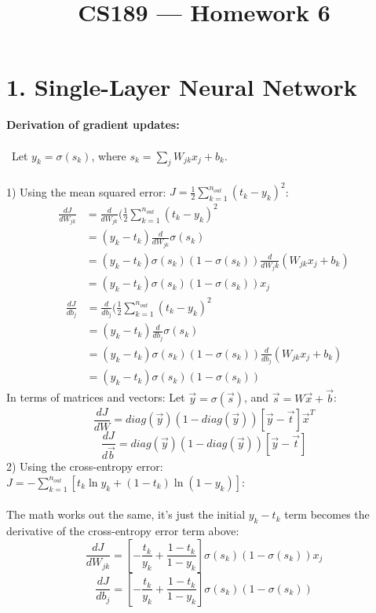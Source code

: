 \documentclass[11pt]{article}
\title{CS189 --- Homework 6}
\author{\Name}
\begin{document}
\maketitle

\section*{1. Single-Layer Neural Network}

\textbf{ Derivation of gradient updates: }
\\\\\
Let $y_k = \sigma ( s_k  ) $, where $s_k  = \sum_j W_{jk} x_j + b_k $.
\\\\
1) Using the mean squared error: $J = \frac{1}{2} \sum_{k=1}^{n_{out}} (t_k - y_k)^2 $:
$$ \begin{aligned}
\frac{dJ}{d W_{jk} } &= \frac{d}{d W_{jk}} ( \frac{1}{2} \sum_{k=1}^{n_{out}} (t_k - y_k)^2 \\
&= (y_k - t_k) \frac{d}{d W_{jk}} \sigma(s_k) \\
&= (y_k - t_k) \sigma(s_k) (1 - \sigma(s_k)) \frac{d}{d W_jk} (W_{jk} x_j + b_k) \\
&= (y_k - t_k) \sigma(s_k) (1 - \sigma(s_k)) x_j 
\end{aligned} $$
$$ \begin{aligned}
\frac{dJ}{d b_j } &= \frac{d}{d b_j} ( \frac{1}{2} \sum_{k=1}^{n_{out}} (t_k - y_k)^2 \\
&= (y_k - t_k) \frac{d}{d b_j} \sigma(s_k) \\
&= (y_k - t_k) \sigma(s_k) (1 - \sigma(s_k)) \frac{d}{d b_j} (W_{jk} x_j + b_k) \\
&= (y_k - t_k) \sigma(s_k) (1 - \sigma(s_k)) 
\end{aligned} $$
In terms of matrices and vectors:
Let $\vec{y} = \sigma ( \vec{s} )$, and $\vec{s} = W \vec{x} + \vec{b} $:
$$ \boxed{\frac{dJ} {dW} = diag(\vec{y}) (1 - diag(\vec{y})) [ \vec{y} - \vec{t} ] \vec{x}^T} $$
$$ \boxed{\frac{dJ} {d\vec{b}} = diag(\vec{y}) (1 - diag(\vec{y})) [ \vec{y} - \vec{t} ]} $$
2) Using the cross-entropy error: $J = - \sum_{k=1}^{n_{out}} [t_k \ln y_k + (1 - t_k) \ln (1 - y_k)] $:
\\\\
The math works out the same, it's just the initial $y_k - t_k$ term becomes the derivative of the cross-entropy error term above:
$$ \frac{dJ}{d W_{jk} } = [ - \frac{t_k}{y_k} + \frac{1 - t_k}{1 - y_k} ] \sigma(s_k) (1 - \sigma(s_k)) x_j $$
$$ \frac{dJ}{d b_j } = [ - \frac{t_k}{y_k} + \frac{1 - t_k}{1 - y_k} ] \sigma(s_k) (1 - \sigma(s_k)) $$
\newpage
\end{document}
